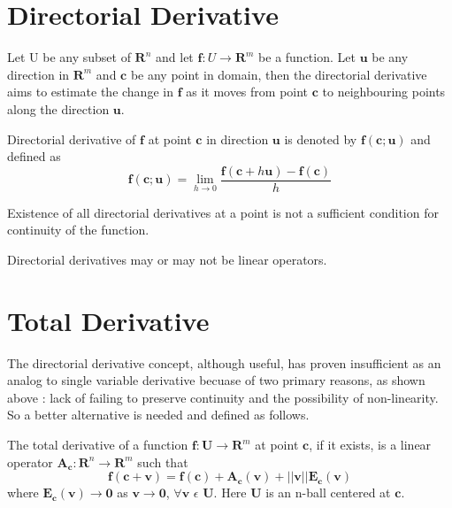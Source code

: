 \section{Directorial Derivative}
Let U be any subset of $\bm{R}^n$ and let $\bm{f} : U \rightarrow \bm{R}^m$  be a function.
Let $\bm{u}$ be any direction in $\bm{R}^m$ and $\bm{c}$ be any point in domain,
then the directorial derivative aims to estimate the change in $\bm{f}$ as it
moves from point $\bm{c}$ to neighbouring points along the direction $\bm{u}$.
\begin{definition}
    Directorial derivative of $\bm{f}$ at point $\bm{c}$ in direction $\bm{u}$ is
    denoted by $\bm{f(c;u)}$ and defined as 
    \[ \bm{f(c;u)} = \lim_{h \to 0}
    \frac{\bm{f}(\bm{c}+h\bm{u})-\bm{f(c)}}{h} \]
\end{definition}
\begin{lemma}
    Existence of all directorial derivatives at a point is not a sufficient
    condition for continuity of the function.
\end{lemma}
\begin{corollary}
    Directorial derivatives may or may not be linear operators.
\end{corollary}


\section{Total Derivative}
The directorial derivative concept, although useful, has proven insufficient as
an analog to single variable derivative becuase of two primary reasons, as shown
above : lack of failing to preserve continuity and the possibility of
non-linearity. So a better alternative is needed and defined as follows.
\begin{definition}
    The total derivative of a function  $\bm{f} : \bm{U} \rightarrow \bm{R}^m$ at point
    $\bm{c}$, if it exists, is a linear operator $\bm{A_{c}} : \bm{R}^n \rightarrow \bm{R}^m$ such
    that
    \[
        \bm{f(c+v) = f(c) + A_{c}(v) + ||v||E_{c}(v)}
    \]
    where $\bm{E_{c}(v) \rightarrow 0}$ as $\bm{v\rightarrow 0}$, $\forall \bm{v}$
    $\epsilon$ $\bm{U}$. Here $\bm{U}$ is an n-ball centered at $\bm{c}$.
\end{definition}


